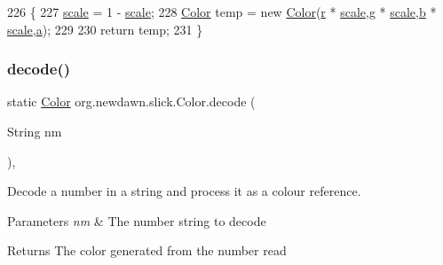\begin{DoxyCode}
226                                      \{
227         \mbox{\hyperlink{classorg_1_1newdawn_1_1slick_1_1_color_a53597f62e247b2193191c3c2a9828fa1}{scale}} = 1 - \mbox{\hyperlink{classorg_1_1newdawn_1_1slick_1_1_color_a53597f62e247b2193191c3c2a9828fa1}{scale}};
228         \mbox{\hyperlink{classorg_1_1newdawn_1_1slick_1_1_color_a39db992a7910141605cc2acb953c4917}{Color}} temp = \textcolor{keyword}{new} \mbox{\hyperlink{classorg_1_1newdawn_1_1slick_1_1_color_a39db992a7910141605cc2acb953c4917}{Color}}(\mbox{\hyperlink{classorg_1_1newdawn_1_1slick_1_1_color_ac07fa95108064b044dcf9a53e95dcb48}{r}} * \mbox{\hyperlink{classorg_1_1newdawn_1_1slick_1_1_color_a53597f62e247b2193191c3c2a9828fa1}{scale}},\mbox{\hyperlink{classorg_1_1newdawn_1_1slick_1_1_color_aa6ebff7c102a1476e7b511a78397b753}{g}} * \mbox{\hyperlink{classorg_1_1newdawn_1_1slick_1_1_color_a53597f62e247b2193191c3c2a9828fa1}{scale}},\mbox{\hyperlink{classorg_1_1newdawn_1_1slick_1_1_color_a8c0cef152e16438fee852a97e50ef7a5}{b}} * 
      \mbox{\hyperlink{classorg_1_1newdawn_1_1slick_1_1_color_a53597f62e247b2193191c3c2a9828fa1}{scale}},\mbox{\hyperlink{classorg_1_1newdawn_1_1slick_1_1_color_ab9288c822ff7614a77c887eb8c2595a7}{a}});
229         
230         \textcolor{keywordflow}{return} temp;
231     \}
\end{DoxyCode}
\mbox{\label{classorg_1_1newdawn_1_1slick_1_1_color_aaaab7a1210006aa8dd51479a056d4cda}} 
\subsubsection{\texorpdfstring{decode()}{decode()}}
{\footnotesize\ttfamily static \mbox{\hyperlink{classorg_1_1newdawn_1_1slick_1_1_color}{Color}} org.\+newdawn.\+slick.\+Color.\+decode (\begin{DoxyParamCaption}\item[{String}]{nm }\end{DoxyParamCaption})\hspace{0.3cm}{\ttfamily [inline]}, {\ttfamily [static]}}

Decode a number in a string and process it as a colour reference.


\begin{DoxyParams}{Parameters}
{\em nm} & The number string to decode \\
\hline
\end{DoxyParams}
\begin{DoxyReturn}{Returns}
The color generated from the number read 
\end{DoxyReturn}

